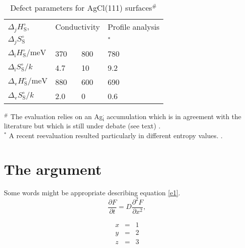 \documentclass{elsart}
\begin{document}
\begin{table*}
\caption{Defect parameters for AgCl(111) surfaces$^{\#}$}
\label{defparagcl} 
\begin{center}
\begin{tabular}{l l l l}
\hline 
$\Delta_j H_{\mathrm{S}}^\circ$, & \multicolumn{2}{c}{Conductivity}& Profile
analysis\\  
\cline{2-4}
$\Delta_j S_{\mathrm{S}}^\circ$ & \cite{S12}& &
\cite{F4}$^\ast$\\ 
\hline 
$\Delta_{\mathrm{i}} H_{\mathrm{S}}^\circ /\mathrm{meV} $ & 370  & 800 & 780\\  
$\Delta_{\mathrm{i}} S_{\mathrm{S}}^\circ / k $ &  4.7 & 10 &  9.2\\ 
$\Delta_{\mathrm{v}} H_{\mathrm{S}}^\circ / \mathrm{meV} $ & 880 & 600 & 690 \\ 
$\Delta_{\mathrm{v}} S_{\mathrm{S}}^\circ / k$ &  2.0 &  0 & 0.6\\ 
\hline 
\end{tabular}
\end{center}

\vspace*{.6cm}
\noindent
$^{\#}$ The evaluation relies on an Ag$_{\mathrm{i}}^\cdot$
accumulation which is in agreement with the literature but which is still
under debate (see text) \cite{phdjam,jmjf}. \\
$^\ast$ A recent reevaluation resulted particularly in different entropy
values. \cite{S14}.
\end{table*}

\section{The argument}
Some words might be appropriate describing equation \ref{e1}.
\begin{equation}
\frac{\partial F}{\partial
t}=D\frac{\partial^2 F}{\partial x^2},
\label{e1}
\end{equation}

\begin{eqnarray}
x & = & 1\\
y & = & 2\\
z & = & 3
\end{eqnarray}
\end{document}
